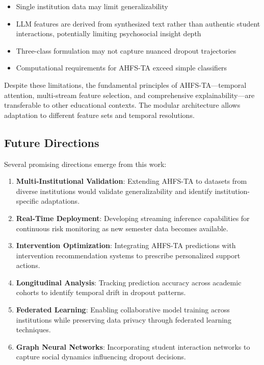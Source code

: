 \documentclass[journal]{IEEEtran}
\begin{document}
\begin{itemize}
\item Single institution data may limit generalizability
\item LLM features are derived from synthesized text rather than authentic student interactions, potentially limiting psychosocial insight depth
\item Three-class formulation may not capture nuanced dropout trajectories
\item Computational requirements for AHFS-TA exceed simple classifiers
\end{itemize}

Despite these limitations, the fundamental principles of AHFS-TA---temporal attention, multi-stream feature selection, and comprehensive explainability---are transferable to other educational contexts. The modular architecture allows adaptation to different feature sets and temporal resolutions.

\subsection{Future Directions}

Several promising directions emerge from this work:

\begin{enumerate}
\item \textbf{Multi-Institutional Validation}: Extending AHFS-TA to datasets from diverse institutions would validate generalizability and identify institution-specific adaptations.

\item \textbf{Real-Time Deployment}: Developing streaming inference capabilities for continuous risk monitoring as new semester data becomes available.

\item \textbf{Intervention Optimization}: Integrating AHFS-TA predictions with intervention recommendation systems to prescribe personalized support actions.

\item \textbf{Longitudinal Analysis}: Tracking prediction accuracy across academic cohorts to identify temporal drift in dropout patterns.

\item \textbf{Federated Learning}: Enabling collaborative model training across institutions while preserving data privacy through federated learning techniques.

\item \textbf{Graph Neural Networks}: Incorporating student interaction networks to capture social dynamics influencing dropout decisions.
\end{enumerate}
\end{document}
